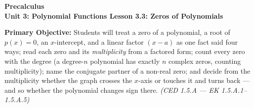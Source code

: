 \documentclass[10pt]{article}
\newcommand{\CourseName}{Precalculus}
\newcommand{\UnitNumberName}{Unit 3: Polynomial Functions \quad}
\newcommand{\LessonNumberName}{Lesson 3.3: Zeros of Polynomials}
\begin{document}
\begin{center}
    {\Large\bfseries \CourseName \\
    {\small\bfseries \UnitNumberName \LessonNumberName}}
\end{center}

\begin{tcolorbox}[colback=lilac, colframe=plum, boxrule=0.9pt, arc=2mm,
    left=2mm, right=2mm, top=1.5mm, bottom=1.5mm]
    \textbf{Primary Objective:} Students will treat a zero of a polynomial, a root of
    $p(x) = 0$, an $x$-intercept, and a linear factor $(x - a)$ as one fact said four ways;
    read each zero and its \textit{multiplicity} from a factored form; count every zero with
    the degree (a degree-$n$ polynomial has exactly $n$ complex zeros, counting multiplicity);
    name the conjugate partner of a non-real zero; and decide from the multiplicity whether the
    graph crosses the $x$-axis or touches it and turns back --- and so whether the polynomial
    changes sign there.
    \hfill\textit{\small (CED 1.5.A --- EK 1.5.A.1--1.5.A.5)}
\end{tcolorbox}
\end{document}
